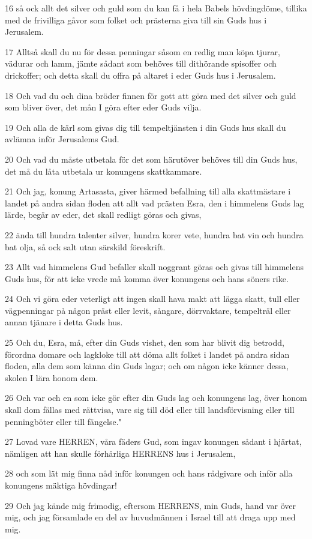 \par 16 så ock allt det silver och guld som du kan få i hela Babels hövdingdöme, tillika med de frivilliga gåvor som folket och prästerna giva till sin Guds hus i Jerusalem.
\par 17 Alltså skall du nu för dessa penningar såsom en redlig man köpa tjurar, vädurar och lamm, jämte sådant som behöves till dithörande spisoffer och drickoffer; och detta skall du offra på altaret i eder Guds hus i Jerusalem.
\par 18 Och vad du och dina bröder finnen för gott att göra med det silver och guld som bliver över, det mån I göra efter eder Guds vilja.
\par 19 Och alla de kärl som givas dig till tempeltjänsten i din Guds hus skall du avlämna inför Jerusalems Gud.
\par 20 Och vad du måste utbetala för det som härutöver behöves till din Guds hus, det må du låta utbetala ur konungens skattkammare.
\par 21 Och jag, konung Artasasta, giver härmed befallning till alla skattmästare i landet på andra sidan floden att allt vad prästen Esra, den i himmelens Guds lag lärde, begär av eder, det skall redligt göras och givas,
\par 22 ända till hundra talenter silver, hundra korer vete, hundra bat vin och hundra bat olja, så ock salt utan särskild föreskrift.
\par 23 Allt vad himmelens Gud befaller skall noggrant göras och givas till himmelens Guds hus, för att icke vrede må komma över konungens och hans söners rike.
\par 24 Och vi göra eder veterligt att ingen skall hava makt att lägga skatt, tull eller vägpenningar på någon präst eller levit, sångare, dörrvaktare, tempelträl eller annan tjänare i detta Guds hus.
\par 25 Och du, Esra, må, efter din Guds vishet, den som har blivit dig betrodd, förordna domare och lagkloke till att döma allt folket i landet på andra sidan floden, alla dem som känna din Guds lagar; och om någon icke känner dessa, skolen I lära honom dem.
\par 26 Och var och en som icke gör efter din Guds lag och konungens lag, över honom skall dom fällas med rättvisa, vare sig till död eller till landsförvisning eller till penningböter eller till fängelse."
\par 27 Lovad vare HERREN, våra fäders Gud, som ingav konungen sådant i hjärtat, nämligen att han skulle förhärliga HERRENS hus i Jerusalem,
\par 28 och som lät mig finna nåd inför konungen och hans rådgivare och inför alla konungens mäktiga hövdingar!
\par 29 Och jag kände mig frimodig, eftersom HERRENS, min Guds, hand var över mig, och jag församlade en del av huvudmännen i Israel till att draga upp med mig.

